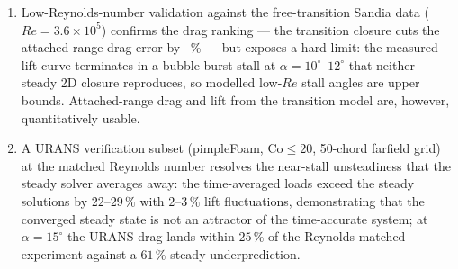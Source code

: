 \documentclass[11pt,a4paper]{article}
\begin{document}
\begin{enumerate}
  \item Low-Reynolds-number validation against the free-transition Sandia data ($Re = 3.6\times10^5$) confirms the drag ranking --- the transition closure cuts the attached-range drag error by \SandiaCdErrDropPct{}~\% --- but exposes a hard limit: the measured lift curve terminates in a bubble-burst stall at $\alpha = 10^\circ$--$12^\circ$ that neither steady 2D closure reproduces, so modelled low-$Re$ stall angles are upper bounds. Attached-range drag and lift from the transition model are, however, quantitatively usable.
  \item A URANS verification subset (pimpleFoam, $\mathrm{Co} \le 20$, 50-chord farfield grid) at the matched Reynolds number resolves the near-stall unsteadiness that the steady solver averages away: the time-averaged loads exceed the steady solutions by $22$--$29\,\%$ with $2$--$3\,\%$ lift fluctuations, demonstrating that the converged steady state is not an attractor of the time-accurate system; at $\alpha = 15^\circ$ the URANS drag lands within $25\,\%$ of the Reynolds-matched experiment against a $61\,\%$ steady underprediction.
\end{enumerate}
\end{document}

